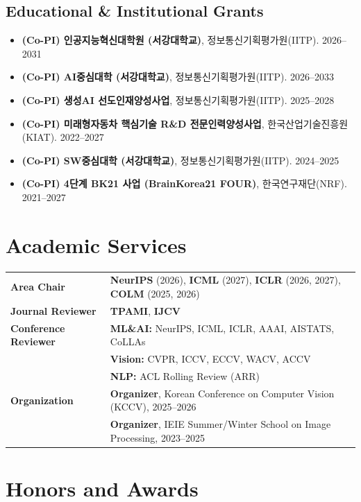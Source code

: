 \documentclass[letterpaper,11pt]{article}
\begin{document}
\subsection*{Educational \& Institutional Grants}
\begin{itemize}[leftmargin=1.2em, itemsep=0.1em]
    \item \textbf{(Co-PI) 인공지능혁신대학원 (서강대학교)}, 정보통신기획평가원(IITP). \hfill 2026--2031
    \item \textbf{(Co-PI) AI중심대학 (서강대학교)}, 정보통신기획평가원(IITP). \hfill 2026--2033
    \item \textbf{(Co-PI) 생성AI 선도인재양성사업}, 정보통신기획평가원(IITP). \hfill 2025--2028
    \item \textbf{(Co-PI) 미래형자동차 핵심기술 R\&D 전문인력양성사업}, 한국산업기술진흥원(KIAT). \hfill 2022--2027
    \item \textbf{(Co-PI) SW중심대학 (서강대학교)}, 정보통신기획평가원(IITP). \hfill 2024--2025
    \item \textbf{(Co-PI) 4단계 BK21 사업 (BrainKorea21 FOUR)}, 한국연구재단(NRF). \hfill 2021--2027
\end{itemize}

\section{Academic Services}
\renewcommand{\arraystretch}{1.2}
\begin{tabular}{@{}p{6.0cm} p{13.0cm}@{}}
\textbf{Area Chair} & \textbf{NeurIPS} (2026), \textbf{ICML} (2027), \textbf{ICLR} (2026, 2027), \textbf{COLM} (2025, 2026) \\
\textbf{Journal Reviewer} & \textbf{TPAMI}, \textbf{IJCV} \\
\textbf{Conference Reviewer} & \textbf{ML\&AI:} NeurIPS, ICML, ICLR, AAAI, AISTATS, CoLLAs \\
 & \textbf{Vision:} CVPR, ICCV, ECCV, WACV, ACCV\\
 & \textbf{NLP:} ACL Rolling Review (ARR)\\
\textbf{Organization} & \textbf{Organizer}, Korean Conference on Computer Vision (KCCV), 2025--2026 \\
 & \textbf{Organizer}, IEIE Summer/Winter School on Image Processing, 2023--2025 \\
\end{tabular}

\section{Honors and Awards}
\end{document}
